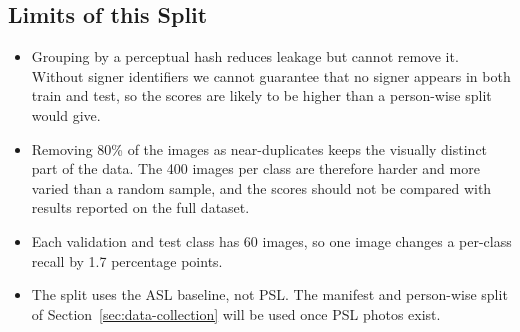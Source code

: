 \subsection{Limits of this Split}
\begin{itemize}
  \item Grouping by a perceptual hash reduces leakage but cannot remove it. Without signer identifiers we cannot guarantee that no signer appears in both train and test, so the scores are likely to be higher than a person-wise split would give.
  \item Removing 80\% of the images as near-duplicates keeps the visually distinct part of the data. The 400 images per class are therefore harder and more varied than a random sample, and the scores should not be compared with results reported on the full dataset.
  \item Each validation and test class has 60 images, so one image changes a per-class recall by 1.7 percentage points.
  \item The split uses the ASL baseline, not PSL. The manifest and person-wise split of Section~\ref{sec:data-collection} will be used once PSL photos exist.
\end{itemize}
